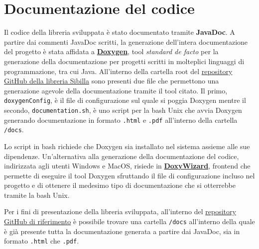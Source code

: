 \section{Documentazione del codice}
Il codice della libreria sviluppata è stato documentato tramite \textbf{JavaDoc}. A partire dai commenti JavaDoc scritti, la generazione dell'intera documentazione del progetto è stata affidata a \href{https://www.doxygen.nl/index.html}{\textbf{Doxygen}}, tool \textit{standard de facto} per la generazione della documentazione per progetti scritti in molteplici linguaggi di programmazione, tra cui Java.
All'interno della cartella root del \href{https://github.com/quasylab/sibilla/tree/working}{repository GitHub della libreria Sibilla} sono presenti due file che permettono una generazione agevole della documentazione tramite il tool citato. Il primo, \texttt{doxygenConfig}, è il file di configurazione sul quale si poggia Doxygen mentre il secondo, \texttt{documentation.sh}, è uno script per la bash Unix che avvia Doxygen generando documentazione in formato \texttt{.html} e \texttt{.pdf} all'interno della cartella \texttt{/docs}.

Lo script in bash richiede che Doxygen sia installato nel sistema assieme alle sue dipendenze. Un'alternativa alla generazione della documentazione del codice, indirizzata agli utenti Windows e MacOS, risiede in \href{https://www.doxygen.nl/manual/doxywizard_usage.html}{\textbf{DoxyWizard}}, frontend che permette di eseguire il tool Doxygen sfruttando il file di configurazione incluso nel progetto e di ottenere il medesimo tipo di documentazione che si otterrebbe tramite la bash Unix.

Per i fini di presentazione della libreria sviluppata, all'interno del \href{https://github.com/quasylab/sibilla/tree/working}{repository GitHub di riferimento} è possibile trovare una cartella \texttt{/docs} all'interno della quale è già presente tutta la documentazione generata a partire dai JavaDoc, sia in formato \texttt{.html} che \texttt{.pdf}.